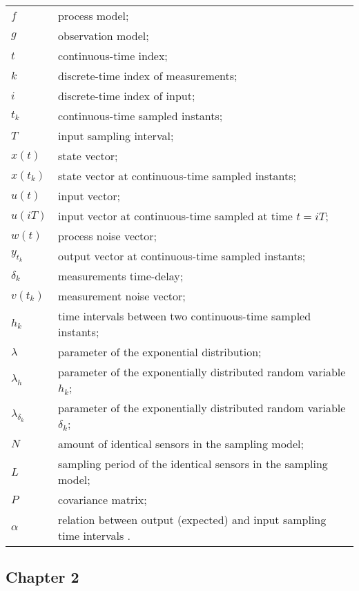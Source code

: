 \begin{longtable}{ll}
$f$						& process model; \\
$g$						& observation model; \\
$t$						& continuous-time index; \\
$k$						& discrete-time index of measurements; \\
$i$						& discrete-time index of input; \\
$t_k$					& continuous-time sampled instants; \\
$T$						& input sampling interval; \\
$x(t)$					& state vector; \\
$x(t_k)$				& state vector at continuous-time sampled instants; \\
$u(t)$					& input vector; \\
$u(iT)$					& input vector at continuous-time sampled at time $t = iT$; \\						
$w(t)$					& process noise vector; \\
$y_{t_k}$            	& output vector at continuous-time sampled instants;\\
$\delta_{k}$			& measurements time-delay; \\
$v(t_k)$				& measurement noise vector; \\
$h_k$					& time intervals between two continuous-time sampled instants; \\
$\lambda$ 				& parameter of the exponential distribution; \\
$\lambda_h$				& parameter of the exponentially distributed random variable $h_k$; \\
$\lambda_{\delta_{k}}$	& parameter of the exponentially distributed random variable $\delta_{k}$; \\
$N$						& amount of identical sensors in the sampling model; \\
$L$						& sampling period of the identical sensors in the sampling model; \\
$P$						& covariance matrix; \\
$\alpha$				& relation between output (expected) and input sampling time intervals . \\
\end{longtable}

\subsection*{Chapter 2}


